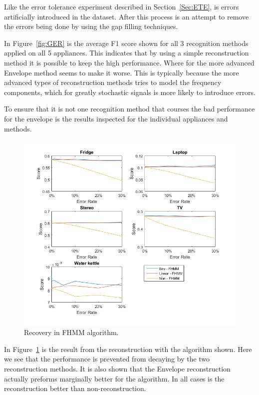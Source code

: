 Like the error tolerance experiment described in Section~\ref{Sec:ETE}, is errors artificially introduced in the dataset. After this process is an attempt to remove the errors being done by using the gap filling techniques. 

In Figure~\ref{fig:GER} is the average F1 score shown for all 3 recognition methods applied on all 5 appliances. This indicates that by using a simple reconstruction method it is possible to keep the high performance. Where for the more advanced Envelope method seems to make it worse. This is typically because the more advanced types of reconstruction methods tries to model the frequency components, which for greatly stochastic signals is more likely to introduce errors. 

To ensure that it is not one recognition method that courses the bad performance for the envelope is the results inspected for the individual appliances and methods. 


\newpage

\begin{figure}[H]
\centering
\includegraphics[width=1\textwidth]{billeder/Rec-FHMM.png}
\caption{Recovery in FHMM algorithm.}
\label{fig:ERFHMM}
\end{figure}

In Figure~\ref{fig:ERFHMM} is the result from the reconstruction with the  algorithm shown. Here we see that the performance is prevented from decaying by the two reconstruction methods. It is also shown that the Envelope reconstruction actually preforms marginally better for the  algorithm. In all cases is the reconstruction better than non-reconstruction. 

